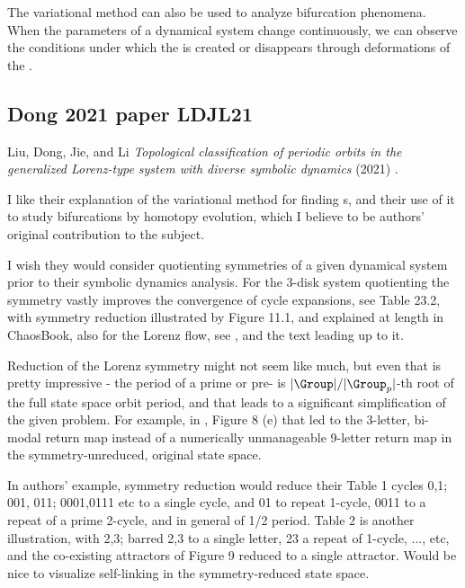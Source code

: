 {{The variational method can also be used to analyze bifurcation phenomena.
When the parameters of a dynamical system change continuously, we can
observe the conditions under which the {\po} is created or
disappears through deformations of the {\po}.









\subsection{Dong 2021 paper {LDJL21}}
\label{sect:LDJL21}

Liu, Dong, Jie, and Li
{\em Topological classification of periodic orbits in the generalized Lorenz-type system with diverse
symbolic dynamics} (2021) .

I like their explanation of the variational method for finding
{\po}s, and their use of it to study bifurcations by homotopy
evolution, which I believe to be authors' original contribution to the
subject.

I wish they would consider quotienting symmetries of a given dynamical
system prior to their symbolic dynamics analysis. For the 3-disk system
quotienting the  symmetry vastly improves the convergence of cycle
expansions, see  {Table 23.2}, with
symmetry reduction illustrated by 
{Figure 11.1}, and explained at length in ChaosBook, also for the Lorenz
flow, see , and the text leading
up to it.

Reduction of the Lorenz   symmetry might not seem like much, but
even that is pretty impressive - the period of a prime or pre-{\po} is $|\Group|/|\Group_p|$-th root of the full state space orbit
period, and that leads to a significant simplification of the given
problem. For example, in ,
 {Figure 8 (e)}
that led to the 3-letter, bi-modal return map instead of a numerically
unmanageable 9-letter return map in the symmetry-unreduced, original
state space.

In authors' example, symmetry reduction would reduce their Table 1 cycles
0,1; 001, 011; 0001,0111 etc to a single cycle, and 01 to repeat 1-cycle,
0011 to a repeat of a prime 2-cycle, and in general of 1/2 period. Table
2 is another illustration, with 2,3; barred 2,3 to a single letter, 23 a
repeat of 1-cycle, ..., etc, and the co-existing attractors of Figure 9
reduced to a single attractor. Would be nice to visualize self-linking in
the symmetry-reduced state space.

}}
